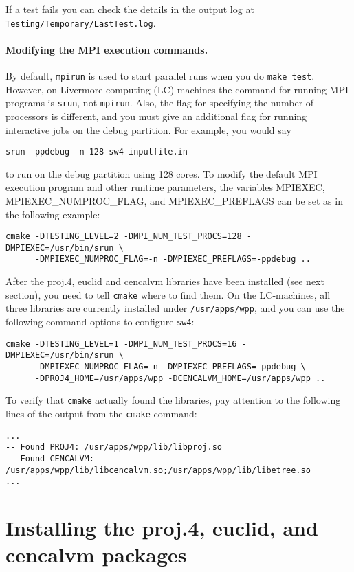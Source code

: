 \documentclass[11pt]{article}
\begin{document}
If a test fails you can check the details in the output log at
\texttt{Testing/Temporary/LastTest.log}.

\paragraph{Modifying the MPI execution commands.}
By default, \verb+mpirun+ is used to start parallel runs when you do \verb+make test+.  However, on
Livermore computing (LC) machines the command for running MPI programs is \verb+srun+, not
\verb+mpirun+. Also, the flag for specifying the number of processors is different, and you must
give an additional flag for running interactive jobs on the debug partition. For example, you would
say
\begin{verbatim}
srun -ppdebug -n 128 sw4 inputfile.in
\end{verbatim}
to run on the debug partition using 128 cores. To modify the default MPI execution program and
other runtime parameters, the variables MPIEXEC, MPIEXEC\_NUMPROC\_FLAG, and
MPIEXEC\_PREFLAGS can be set as in the following example:
\begin{verbatim}
cmake -DTESTING_LEVEL=2 -DMPI_NUM_TEST_PROCS=128 -DMPIEXEC=/usr/bin/srun \
      -DMPIEXEC_NUMPROC_FLAG=-n -DMPIEXEC_PREFLAGS=-ppdebug ..
\end{verbatim}

After the proj.4, euclid and cencalvm libraries have been installed (see next section), you need to tell
\verb+cmake+ where to find them. On the LC-machines, all three libraries are currently installed under
\verb+/usr/apps/wpp+, and you can use the following command options to configure \verb+sw4+:
\begin{verbatim}
cmake -DTESTING_LEVEL=1 -DMPI_NUM_TEST_PROCS=16 -DMPIEXEC=/usr/bin/srun \
      -DMPIEXEC_NUMPROC_FLAG=-n -DMPIEXEC_PREFLAGS=-ppdebug \
      -DPROJ4_HOME=/usr/apps/wpp -DCENCALVM_HOME=/usr/apps/wpp ..
\end{verbatim}
To verify that \verb+cmake+ actually found the libraries, pay attention to the
following lines of the output from the \verb+cmake+ command:
\begin{verbatim}
...
-- Found PROJ4: /usr/apps/wpp/lib/libproj.so  
-- Found CENCALVM: /usr/apps/wpp/lib/libcencalvm.so;/usr/apps/wpp/lib/libetree.so  
...
\end{verbatim}

\section{Installing the proj.4, euclid, and cencalvm packages}\label{sec:cencalvm-install}
 
\end{document}
